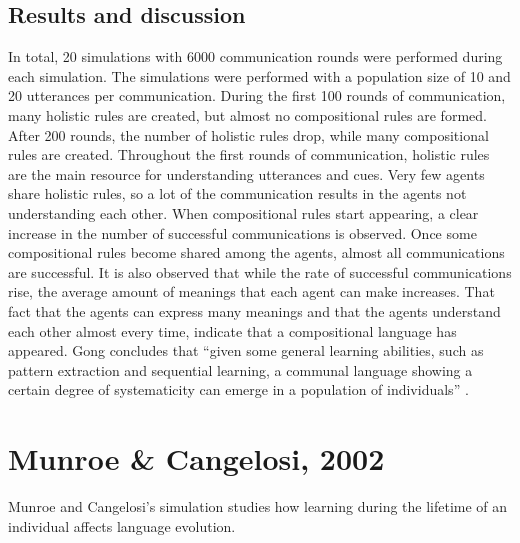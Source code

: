 \subsection{Results and discussion}
In total, 20 simulations with 6000 communication rounds were performed during each simulation. The simulations were performed with a population size of 10 and 20 utterances per communication. During the first 100 rounds of communication, many holistic rules are created, but almost no compositional rules are formed. After 200 rounds, the number of holistic rules drop, while many compositional rules are created. Throughout the first rounds of communication, holistic rules are the main resource for understanding utterances and cues. Very few agents share holistic rules, so a lot of the communication results in the agents not understanding each other. When compositional rules start appearing, a clear increase in the number of successful communications is observed. Once some compositional rules become shared among the agents, almost all communications are successful. It is also observed that while the rate of successful communications rise, the average amount of meanings that each agent can make increases. That fact that the agents can express many meanings and that the agents understand each other almost every time, indicate that a compositional language has appeared. 
Gong concludes that ``given some general learning abilities, such as pattern extraction and sequential learning, a communal language showing a certain degree of systematicity can emerge in a population of individuals'' \citep[chapter 6]{gong2011simulating}.


\section{Munroe \& Cangelosi, 2002}\label{sec:Munroe}
Munroe and Cangelosi's simulation \citep{munroe2002learning} studies how learning during the lifetime of an individual affects language evolution.

